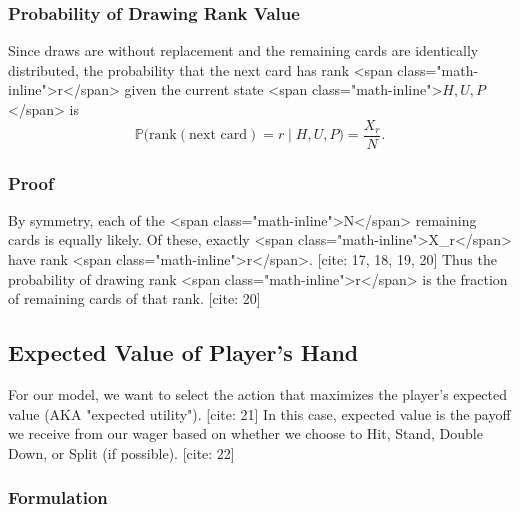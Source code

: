 \documentclass[12pt,a4paper]{cibb}
\begin{document}
\subsubsection{Probability of Drawing Rank Value}

Since draws are without replacement and the remaining cards are identically distributed, the probability that the next card has rank <span class="math-inline">r</span> given the current state <span class="math-inline">\(H,U,P\)</span> is
\[
  \mathbb{P}\bigl(\mathrm{rank}(\text{next card}) = r \mid H, U, P\bigr)
  = \frac{X_r}{N}.
\]

\subsubsection{Proof}

By symmetry, each of the <span class="math-inline">N</span> remaining cards is equally likely.  Of these, exactly <span class="math-inline">X\_r</span> have rank <span class="math-inline">r</span>. [cite: 17, 18, 19, 20]
Thus the probability of drawing rank <span class="math-inline">r</span> is the fraction of remaining cards of that rank. [cite: 20]

\subsection{Expected Value of Player's Hand}
\label{sec:Expected Value}
For our model, we want to select the action that maximizes the player's expected value (AKA "expected utility"). [cite: 21]
In this case, expected value is the payoff we receive from our wager based on whether we choose to Hit, Stand, Double Down, or Split (if possible). [cite: 22]

\subsubsection{Formulation}
\end{document}
